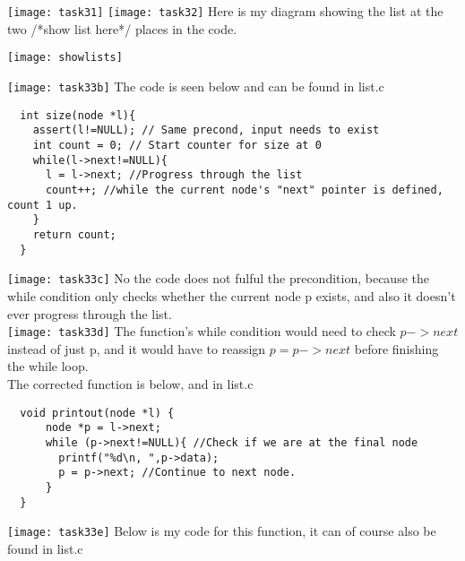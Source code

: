 \documentclass{article}
\begin{document}
\section{}
\texttt{[image: task31]} 
\texttt{[image: task32]} 
Here is my diagram showing the list at the two /*show list here*/ places in the code.\\
\begin{center} \texttt{[image: showlists]}
\end{center}
\vspace{10cm}
\texttt{[image: task33b]} 
The code is seen below and can be found in list.c
\begin{lstlisting}
  int size(node *l){
    assert(l!=NULL); // Same precond, input needs to exist
    int count = 0; // Start counter for size at 0
    while(l->next!=NULL){ 
      l = l->next; //Progress through the list
      count++; //while the current node's "next" pointer is defined, count 1 up.
    }
    return count;
  }
\end{lstlisting}
\vspace{1cm}
\texttt{[image: task33c]}
No the code does not fulful the precondition, because the while condition
only checks whether the current node p exists, and also it doesn't ever progress through the list.\\
\texttt{[image: task33d]}
The function's while condition would need to check $\si{p->next}$ instead of just p, and it would have to reassign $\si{p = p->next}$ before finishing the while loop.\\
The corrected function is below, and in list.c
\begin{lstlisting}
  void printout(node *l) {
      node *p = l->next;
      while (p->next!=NULL){ //Check if we are at the final node
        printf("%d\n, ",p->data);
        p = p->next; //Continue to next node.
      }
  }
\end{lstlisting}
\vspace{3cm}
\texttt{[image: task33e]}
Below is my code for this function, it can of course also be found in list.c
\end{document}
